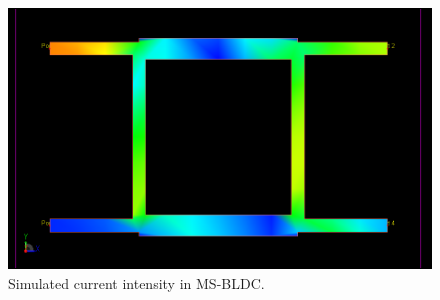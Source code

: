 \begin{figure}[H]
	\centering
	\includegraphics[width=\textwidth,keepaspectratio]{figures/sim_field_colors.png}
	\caption{Simulated current intensity in MS-BLDC.}
	\label{fig:big-sim-field-colors}
\end{figure}

